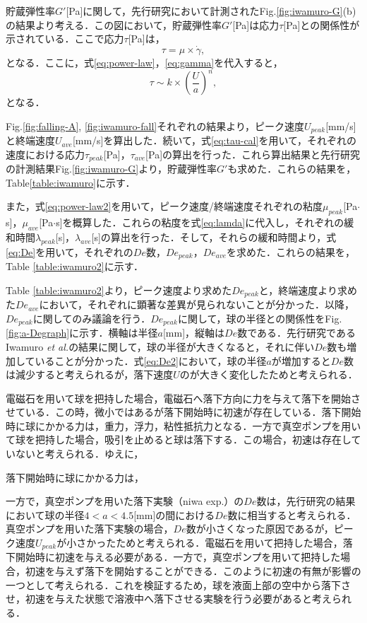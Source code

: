 貯蔵弾性率$G'$[Pa]に関して，先行研究において計測されたFig.\ref{fig:iwamuro-G}(b)の結果より考える．この図において，貯蔵弾性率$G'$[Pa]は応力$\tau$[Pa]との関係性が示されている．ここで応力$\tau$[Pa]は，
\begin{equation}
    \tau = \mu \times \dot{\gamma} ,
    \label{eq:tau}
\end{equation}
となる．ここに，式\ref{eq:power-law}，\ref{eq:gamma}を代入すると，
\begin{equation}
    \tau \sim k \times \left(\frac{U}{a}\right)^n , 
    \label{eq:tau-cal}
\end{equation}
となる．

Fig.\ref{fig:falling-A}, \ref{fig:iwamuro-fall}それぞれの結果より，ピーク速度$U_{peak}$[mm/s]と終端速度$U_{ave}$[mm/s]を算出した．続いて，式\ref{eq:tau-cal}を用いて，それぞれの速度における応力$\tau_{peak}$[Pa]，$\tau_{ave}$[Pa]の算出を行った．これら算出結果と先行研究の計測結果Fig.\ref{fig:iwamuro-G}より，貯蔵弾性率$G'$も求めた．これらの結果を，Table\ref{table:iwamuro}に示す．

また，式\ref{eq:power-law2}を用いて，ピーク速度/終端速度それぞれの粘度$\mu_{peak}$[Pa$\cdot$s]，$\mu_{ave}$[Pa$\cdot$s]を概算した．これらの粘度を式\ref{eq:lamda}に代入し，それぞれの緩和時間$\lambda_{peak}$[s]，$\lambda_{ave}$[s]の算出を行った．そして，それらの緩和時間より，式\ref{eq:De}を用いて，それぞれの$De$数，$De_{peak}$，$De_{ave}$を求めた．これらの結果を，Table \ref{table:iwamuro2}に示す．

Table \ref{table:iwamuro2}より，ピーク速度より求めた$De_{peak}$と，終端速度より求めた$De_{ave}$において，それぞれに顕著な差異が見られないことが分かった．以降，$De_{peak}$に関してのみ議論を行う．$De_{peak}$に関して，球の半径との関係性をFig.\ref{fig:a-Degraph}に示す．横軸は半径$a$[mm]，縦軸は$De$数である．先行研究であるIwamuro \textit{et al.}\cite{ref:8}の結果に関して，球の半径が大きくなると，それに伴い$De$数も増加していることが分かった．式\ref{eq:De2}において，球の半径$a$が増加すると$De$数は減少すると考えられるが，落下速度$U$のが大きく変化したためと考えられる．

電磁石を用いて球を把持した場合，電磁石へ落下方向に力を与えて落下を開始させている．この時，微小ではあるが落下開始時に初速が存在している．落下開始時に球にかかる力は，重力，浮力，粘性抵抗力となる．一方で真空ポンプを用いて球を把持した場合，吸引を止めると球は落下する．この場合，初速は存在していないと考えられる．ゆえに，


落下開始時に球にかかる力は，

一方で，真空ポンプを用いた落下実験（niwa exp.）の$De$数は，先行研究の結果において球の半径$4<a<4.5$[mm]の間における$De$数に相当すると考えられる．真空ポンプを用いた落下実験の場合，$De$数が小さくなった原因であるが，ピーク速度$U_{peak}$が小さかったためと考えられる．電磁石を用いて把持した場合，落下開始時に初速を与える必要がある．一方で，真空ポンプを用いて把持した場合，初速を与えず落下を開始することができる．このように初速の有無が影響の一つとして考えられる．これを検証するため，球を液面上部の空中から落下させ，初速を与えた状態で溶液中へ落下させる実験を行う必要があると考えられる．

